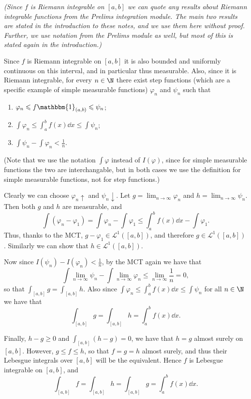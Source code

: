 \documentclass{maths}
\newcommand{\ind}{\mathbbm{1}}
\begin{document}
\begin{prf}
    \emph{(Since $f$ is Riemann integrable on $[a,b]$ we can quote any results about Riemann integrable functions from the Prelims integration module.
    The main two results are stated in the introduction to these notes, and we use them here without proof.
    Further, we use notation from the Prelims module as well, but most of this is stated again in the introduction.)}

    Since $f$ is Riemann integrable on $[a,b]$ it is also bounded and uniformly continuous on this interval, and in particular thus measurable.
    Also, since it is Riemann integrable, for every $n\in\N$ there exist step functions (which are a specific example of simple measurable functions) $\varphi_n$ and $\psi_n$ such that
    \begin{enumerate}
        \item $\varphi_n\leqslant f\ind_{(a,b)}\leqslant\psi_n$;
        \item $\int\varphi_n\leqslant\int_a^b f(x)\dd{x}\leqslant \int\psi_n$;
        \item $\int\psi_n-\int\varphi_n<\frac{1}{n}$.
    \end{enumerate}
    (Note that we use the notation $\int\varphi$ instead of $I(\varphi)$, since for simple measurable functions the two are interchangable, but in both cases we use the definition for simple measurable functions, not for step functions.)

    Clearly we can choose $\varphi_n\uparrow$ and $\psi_n\downarrow$.
    Let $g=\lim_{n\to\infty}\varphi_n$ and $h=\lim_{n\to\infty}\psi_n$.
    Then both $g$ and $h$ are measurable, and
    \[
        \int(\varphi_n - \varphi_1) =
        \int\varphi_n - \int\varphi_1 \leqslant
        \int_a^b f(x)\dd{x} - \int\varphi_1.
    \]
    Thus, thanks to the MCT, $g-\varphi_1\in \mathcal{L}^1([a,b])$, and therefore $g\in \mathcal{L}^1([a,b])$.
    Similarly we can show that $h\in \mathcal{L}^1([a,b])$.

    Now since $I(\psi_n)-I(\varphi_n)<\frac{1}{n}$, by the MCT again we have that
    \[
        \int\lim_{n\to\infty}\psi_n - \int\lim_{n\to\infty}\varphi_n \leqslant
        \lim_{n\to\infty}\frac{1}{n} =
        0,
    \]
    so that $\int_{[a,b]}g=\int_{[a,b]}h$.
    Also since $\int\varphi_n\leqslant\int_a^b f(x)\dd{x}\leqslant \int\psi_n$ for all $n\in\N$ we have that
    \[
        \int_{[a,b]}g=\int_{[a,b]}h=\int_a^b f(x)\dd{x}.
    \]

    Finally, $h-g\geqslant0$ and $\int_{[a,b]}(h-g)=0$, we have that $h=g$ almost surely on $[a,b]$.
    However, $g\leqslant f\leqslant h$, so that $f=g=h$ almost surely, and thus their Lebesgue integrals over $[a,b]$ will be the equivalent.
    Hence $f$ is Lebesgue integrable on $[a,b]$, and
    \[
        \int_{[a,b]} f =
        \int_{[a,b]} h =
        \int_{[a,b]} g =
        \int_a^b f(x) \dd{x}.
    \]
\end{prf}
\end{document}
